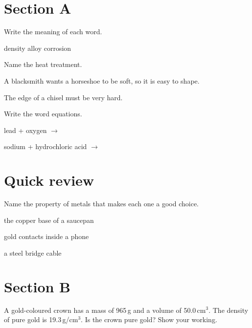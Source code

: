 \documentclass[11pt]{article}
\begin{document}

\section{Section A}
\Q Write the meaning of each word.
\par{} density
 alloy
 corrosion

\Q Name the heat treatment.
\par{} A blacksmith wants a horseshoe to be soft, so it is easy to shape. \hfill{}
\par{} The edge of a chisel must be very hard. \hfill{}\par\vspace{1mm}

\Q Write the word equations.
\par{} lead + oxygen $\longrightarrow$ 
\par{} sodium + hydrochloric acid $\longrightarrow$ \par\vspace{1mm}

\section{Quick review}
\Q Name the property of metals that makes each one a good choice.
\par{} the copper base of a saucepan \hfill{}
\par{} gold contacts inside a phone \hfill{}
\par{} a steel bridge cable \hfill{}\par\vspace{1mm}

\section{Section B}
\Q A gold-coloured crown has a mass of 965\,g and a volume of 50.0\,cm$^{3}$. The density of pure gold is 19.3\,g/cm$^{3}$. Is the crown pure gold? Show your working.
\end{document}
